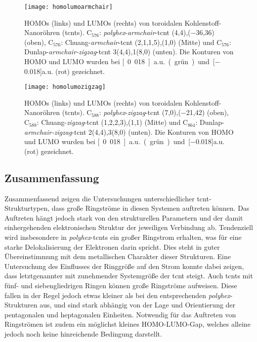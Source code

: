 \begin{figure}[ht!]
	\centering
	\texttt{[image: homolumoarmchair]}
	\captionsetup{figurewithin = chapter}
	\captionsetup{font=small, labelfont=bf}\caption[HOMO und LUMO von toroidalen Kohlenstoff-Nanoröhren 1]{HOMOs (links) und LUMOs (rechts) von toroidalen Kohlenstoff-Nanoröhren (\acp{tcnt}). C$_{576}$: \textit{polyhex}-\textit{armchair}-\ac{tcnt} (4,4),($-$36,36) (oben), C$_{576}$: Chuang-\textit{armchair}-\ac{tcnt} (2,1,1,5),(1,0) (Mitte) und C$_{576}$: Dunlap-\textit{armchair-zigzag}-\ac{tcnt} 3(4,4),1(8,0) (unten). Die Konturen von HOMO und LUMO wurden bei \unit[0.018]{a.u.} (grün) und \unit[$-$0.018]{a.u.} (rot) gezeichnet.}
\label{abb:homolumoarmchair}
\end{figure}

\begin{figure}[ht!]
	\centering
	\texttt{[image: homolumozigzag]}
	\captionsetup{figurewithin = chapter}
	\captionsetup{font=small, labelfont=bf}\caption[HOMO und LUMO von toroidalen Kohlenstoff-Nanoröhren 2]{HOMOs (links) und LUMOs (rechts) von toroidalen Kohlenstoff-Nanoröhren (\acp{tcnt}). C$_{588}$: \textit{polyhex}-\textit{zigzag}-\ac{tcnt} (7,0),($-$21,42) (oben), C$_{588}$: Chuang-\textit{zigzag}-\ac{tcnt} (1,2,2,3),(1,1) (Mitte) und C$_{864}$: Dunlap-\textit{armchair-zigzag}-\ac{tcnt} 2(4,4),3(8,0) (unten). Die Konturen von HOMO und LUMO wurden bei \unit[0.018]{a.u.} (grün) und \unit[$-$0.018]{a.u.} (rot) gezeichnet.}
\label{abb:homolumozigzag}
\end{figure}

\FloatBarrier
\subsection{Zusammenfassung}
Zusammenfassend zeigen die Untersuchungen unterschiedlicher \ac{tcnt}-Strukturtypen, dass große Ringströme in diesen Systemen auftreten können. Das Auftreten hängt jedoch stark von den strukturellen Parametern und der damit einhergehenden elektronischen Struktur der jeweiligen Verbindung ab. Tendenziell wird insbesondere in \textit{polyhex}-\acp{tcnt} ein großer Ringstrom erhalten, was für eine starke Delokalisierung der Elektronen darin spricht. Dies steht in guter Übereinstimmung mit dem metallischen Charakter dieser Strukturen. Eine Untersuchung des Einflusses der Ringgröße auf den Strom konnte dabei zeigen, dass letztgenannter mit zunehmender Systemgröße der \ac{tcnt} steigt. Auch \acp{tcnt} mit fünf- und siebengliedrigen Ringen können große Ringströme aufweisen. Diese fallen in der Regel jedoch etwas kleiner als bei den entsprechenden \textit{polyhex}-Strukturen aus, und sind stark abhängig von der Lage und Orientierung der pentagonalen und heptagonalen Einheiten. Notwendig für das Auftreten von Ringströmen ist zudem ein möglichst kleines HOMO-LUMO-Gap, welches alleine jedoch noch keine hinreichende Bedingung darstellt.

